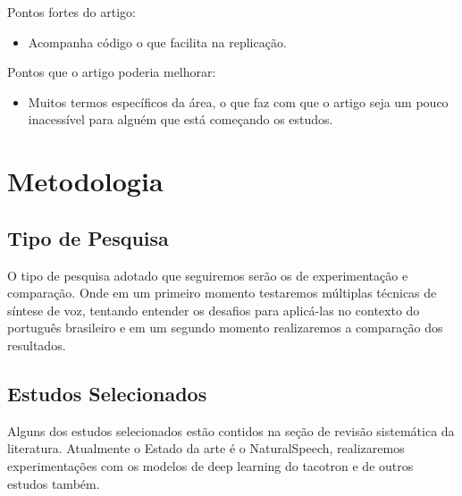 \documentclass[a4paper,12pt]{article}
\begin{document}

			Pontos fortes do artigo:
			
			\begin{itemize}
				\item Acompanha código o que facilita na replicação.
			\end{itemize}
			Pontos que o artigo poderia melhorar:
			\begin{itemize}
				\item Muitos termos específicos da área, o que faz com que o artigo seja um pouco inacessível para alguém que está começando os estudos.
			\end{itemize}
			
	\section{Metodologia}
		\subsection{Tipo de Pesquisa}
		O tipo de pesquisa adotado que seguiremos serão os de experimentação e comparação. Onde em um primeiro momento testaremos múltiplas técnicas de síntese de voz, tentando entender os desafios para aplicá-las no contexto do português brasileiro e em um segundo momento realizaremos a comparação dos resultados.
		
		\subsection{Estudos Selecionados}
		Alguns dos estudos selecionados estão contidos na seção de revisão sistemática da literatura. Atualmente o Estado da arte é o NaturalSpeech, realizaremos experimentações com os modelos de deep learning do tacotron e de outros estudos também.
		
\end{document}
